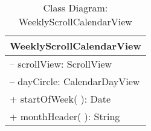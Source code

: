 \begin{table}[ht]
\centering
\caption{Class Diagram: WeeklyScrollCalendarView}

\hspace{1em}
\renewcommand{\arraystretch}{1.7}

\begin{tabular}{|l|}
\hline
\textbf{WeeklyScrollCalendarView} \\
\hline
– scrollView: ScrollView \\
– dayCircle: CalendarDayView \\
\hdashline
+ startOfWeek( ): Date \\
+ monthHeader( ): String \\
\hline
\end{tabular}
\end{table}
